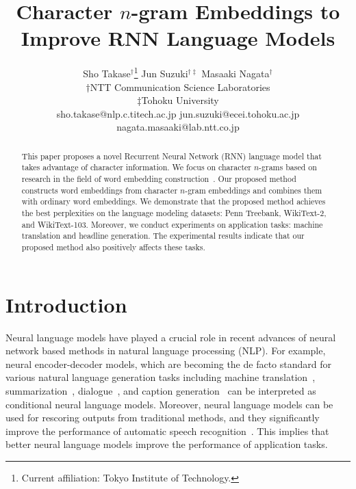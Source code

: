 \documentclass[letterpaper]{article} %
\begin{document}
%
\title{Character $n$-gram Embeddings to Improve RNN Language Models}
\author{Sho Takase$^\dagger$\thanks{Current affiliation: Tokyo Institute of Technology.} \hspace{1.5em} Jun Suzuki$^{\dagger \ddagger}$ \hspace{1.5em} Masaaki Nagata$^\dagger$ \\
  $\dagger$NTT Communication Science Laboratories \\ $\ddagger$Tohoku University \\
  { sho.takase@nlp.c.titech.ac.jp} \hspace{1.5em} { jun.suzuki@ecei.tohoku.ac.jp} \hspace{1.5em} { nagata.masaaki@lab.ntt.co.jp}
  }
\maketitle
\begin{abstract}
  This paper proposes a novel Recurrent Neural Network (RNN) language model that takes advantage of character information.
  We focus on character $n$-grams based on research in the field of word embedding construction~\cite{wieting-EtAl:2016:EMNLP2016}.
  Our proposed method constructs word embeddings from character $n$-gram embeddings and combines them with ordinary word embeddings.
  We demonstrate that the proposed method achieves the best perplexities on the language modeling datasets: Penn Treebank, WikiText-2, and WikiText-103.
  Moreover, we conduct experiments on application tasks: machine translation and headline generation.
  The experimental results indicate that our proposed method also positively affects these tasks.
\end{abstract}

\section{Introduction}\label{sec:intro}
Neural language models have played a crucial role in recent advances of neural network based methods in natural language processing (NLP).
For example, neural encoder-decoder models, which are becoming the de facto standard for various natural language generation tasks including machine translation~\cite{Sutskever:2014:SSL:2969033.2969173}, summarization~\cite{rush-chopra-weston:2015:EMNLP}, dialogue~\cite{wen-EtAl:2015:EMNLP}, and caption generation~\cite{Vinyals_2015_CVPR} can be interpreted as conditional neural language models.
Moreover, neural language models can be used for rescoring outputs from traditional methods, and they significantly improve the performance of automatic speech recognition~\cite{chime4asr}.
This implies that better neural language models improve the performance of application tasks.
\end{document}
